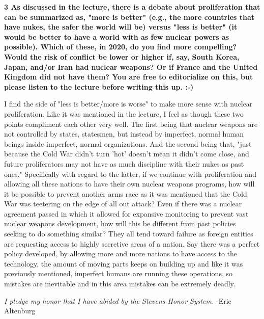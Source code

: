 \documentclass[12pt]{turabian-researchpaper}
\newcommand\question[2]{\noindent\textbf{#1 \quad #2}}
\begin{document}
\question{3}{As discussed in the lecture, there is a debate about proliferation that can be summarized as, "more is better" (e.g., the more countries that have nukes, the safer the world will be) versus "less is better" (it would be better to have a world with as few nuclear powers as possible). Which of these, in 2020, do you find more compelling? Would the risk of conflict be lower or higher if, say, South Korea, Japan, and/or Iran had nuclear weapons? Or if France and the United Kingdom did not have them? You are free to editorialize on this, but please listen to the lecture before writing this up. :-)}

	I find the side of "less is better/more is worse" to make more sense with nuclear proliferation. Like it was mentioned in the lecture, I feel as though these two points compliment each other very well. The first being that nuclear weapons are not controlled by states, statesmen, but instead by imperfect, normal human beings inside imperfect, normal organizations. And the second being that, "just because the Cold War didn't turn 'hot' doesn't mean it didn't come close, and future proliferators may not have as much discipline with their nukes as past ones." Specifically with regard to the latter, if we continue with proliferation and allowing all these nations to have their own nuclear weapons programs, how will it be possible to prevent another arms race as it was mentioned that the Cold War was teetering on the edge of all out attack? Even if there was a nuclear agreement passed in which it allowed for expansive monitoring to prevent vast nuclear weapons development, how will this be different from past policies seeking to do something similar? They all tend toward failure as foreign entities are requesting access to highly secretive areas of a nation. Say there was a perfect policy developed, by allowing more and more nations to have access to the technology, the amount of moving parts keeps on building up and like it was previously mentioned, imperfect humans are running these operations, so mistakes are inevitable and in this area mistakes can be extremely deadly.


\vspace*{\fill}
\noindent\textit{I pledge my honor that I have abided by the Stevens Honor System.} -Eric Altenburg
\end{document}
